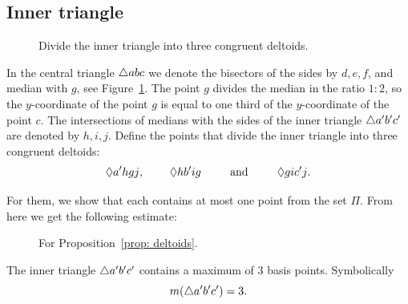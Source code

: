 \subsection{Inner triangle}

\begin{figure}
\begin{center}

\end{center}
\caption{Divide the inner triangle into three congruent deltoids.}
\label{fig: deltoids}
\end{figure}

In the central triangle $\triangle{abc}$ we denote the bisectors of the sides by $d, e, f$, and median with $g$, see Figure~\ref{fig: deltoids}. The point $g$ divides the median in the ratio $1:2$, so the $y$-coordinate of the point $g$ is equal to one third of the $y$-coordinate of the point $c$. The intersections of medians with the sides of the inner triangle $\triangle{a'b'c'}$ are denoted by $h, i, j$. Define the points that divide the inner triangle into three congruent deltoids:
$$
\Diamond{a'hgj},\text{\hspace{0.8cm}} \Diamond{hb'ig}\text{\hspace{0.8cm}   and   \hspace{0.8cm}} \Diamond{gic'j}.
$$

For them, we show that each contains at most one point from the set $\Pi$. From here we get the following estimate:

\begin{figure}
\begin{center}

\end{center}
\caption{For Proposition~\ref{prop: deltoids}.}
\label{fig: deltoids-together}
\end{figure}

\begin{proposition}
\label{prop: deltoids}
The inner triangle $\triangle{a'b'c'}$ contains a maximum of 3 basis points. Symbolically
$$
  m(\triangle{a'b'c'}) = 3.
$$
\end{proposition}

